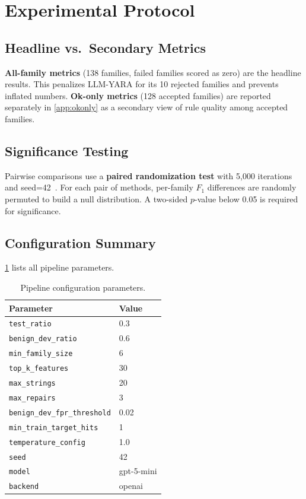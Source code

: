 \documentclass[10pt,twocolumn]{article}
\newcommand{\sysname}{\textsc{LLM-YARA}\xspace}
\begin{document}
\section{Experimental Protocol}
\label{sec:protocol}

\subsection{Headline vs.\ Secondary Metrics}
\textbf{All-family metrics} (138 families, failed families scored as
zero) are the headline results.  This penalizes \sysname for its 10
rejected families and prevents inflated numbers.
\textbf{Ok-only metrics} (128 accepted families) are reported
separately in \cref{app:okonly} as a secondary view of rule quality
among accepted families.

\subsection{Significance Testing}
Pairwise comparisons use a \textbf{paired randomization test} with
5,000 iterations and seed=42~\cite{noreen1989permutation}.  For each
pair of methods, per-family $F_1$ differences are randomly permuted to
build a null distribution.  A two-sided $p$-value below 0.05 is
required for significance.

\subsection{Configuration Summary}
\cref{tab:config} lists all pipeline parameters.

\begin{table}[h]
\centering
\caption{Pipeline configuration parameters.}
\label{tab:config}
\small
\begin{tabular}{@{}ll@{}}
\toprule
\textbf{Parameter} & \textbf{Value} \\
\midrule
\texttt{test\_ratio}             & 0.3   \\
\texttt{benign\_dev\_ratio}      & 0.6   \\
\texttt{min\_family\_size}       & 6     \\
\texttt{top\_k\_features}        & 30    \\
\texttt{max\_strings}            & 20    \\
\texttt{max\_repairs}            & 3     \\
\texttt{benign\_dev\_fpr\_threshold} & 0.02 \\
\texttt{min\_train\_target\_hits}    & 1    \\
\texttt{temperature\_config}      & 1.0   \\
\texttt{seed}                    & 42    \\
\texttt{model}                   & gpt-5-mini \\
\texttt{backend}                 & openai \\
\bottomrule
\end{tabular}
\end{table}
\end{document}
